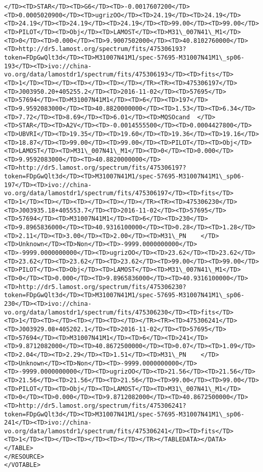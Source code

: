 \documentclass[11pt]{article}
\begin{document}
\begin{Verbatim}[commandchars=\\\{\}]
</TD><TD>STAR</TD><TD>G6</TD><TD>-0.0017607200</TD><TD>0.0005020900</TD><TD>ugrizOO</TD><TD>24.19</TD><TD>24.19</TD><TD>24.19</TD><TD>24.19</TD><TD>24.19</TD><TD>99.00</TD><TD>99.00</TD><TD>PILOT</TD><TD>Obj</TD><TD>LAMOST</TD><TD>M31\_007N41\_M1</TD><TD>0</TD><TD>0.000</TD><TD>9.9007502000</TD><TD>40.8102760000</TD><TD>http://dr5.lamost.org/spectrum/fits/475306193?token=FDpGwQlt3d</TD><TD>M31007N41M1/spec-57695-M31007N41M1\_sp06-193</TD><TD>ivo://china-vo.org/data/lamostdr1/spectrum/fits/475306193</TD><TD>fits</TD><TD>1</TD><TD></TD><TD></TD><TD></TD></TR><TR><TD>475306197</TD><TD>J003950.20+405255.2</TD><TD>2016-11-02</TD><TD>57695</TD><TD>57694</TD><TD>M31007N41M1</TD><TD>6</TD><TD>197</TD><TD>9.9592083000</TD><TD>40.8820000000</TD><TD>1.53</TD><TD>6.34</TD><TD>7.72</TD><TD>8.69</TD><TD>6.01</TD><TD>MQSOcand  </TD><TD>STAR</TD><TD>A2V</TD><TD>-0.0014555500</TD><TD>0.0004427800</TD><TD>UBVRI</TD><TD>19.35</TD><TD>19.60</TD><TD>19.36</TD><TD>19.16</TD><TD>18.87</TD><TD>99.00</TD><TD>99.00</TD><TD>PILOT</TD><TD>Obj</TD><TD>LAMOST</TD><TD>M31\_007N41\_M1</TD><TD>0</TD><TD>0.000</TD><TD>9.9592083000</TD><TD>40.8820000000</TD><TD>http://dr5.lamost.org/spectrum/fits/475306197?token=FDpGwQlt3d</TD><TD>M31007N41M1/spec-57695-M31007N41M1\_sp06-197</TD><TD>ivo://china-vo.org/data/lamostdr1/spectrum/fits/475306197</TD><TD>fits</TD><TD>1</TD><TD></TD><TD></TD><TD></TD></TR><TR><TD>475306230</TD><TD>J003935.18+405553.7</TD><TD>2016-11-02</TD><TD>57695</TD><TD>57694</TD><TD>M31007N41M1</TD><TD>6</TD><TD>230</TD><TD>9.8965836000</TD><TD>40.9316100000</TD><TD>0.28</TD><TD>1.28</TD><TD>2.11</TD><TD>3.00</TD><TD>2.00</TD><TD>M31\_PN    </TD><TD>Unknown</TD><TD>Non</TD><TD>-9999.0000000000</TD><TD>-9999.0000000000</TD><TD>ugrizOO</TD><TD>23.62</TD><TD>23.62</TD><TD>23.62</TD><TD>23.62</TD><TD>23.62</TD><TD>99.00</TD><TD>99.00</TD><TD>PILOT</TD><TD>Obj</TD><TD>LAMOST</TD><TD>M31\_007N41\_M1</TD><TD>0</TD><TD>0.000</TD><TD>9.8965836000</TD><TD>40.9316100000</TD><TD>http://dr5.lamost.org/spectrum/fits/475306230?token=FDpGwQlt3d</TD><TD>M31007N41M1/spec-57695-M31007N41M1\_sp06-230</TD><TD>ivo://china-vo.org/data/lamostdr1/spectrum/fits/475306230</TD><TD>fits</TD><TD>1</TD><TD></TD><TD></TD><TD></TD></TR><TR><TD>475306241</TD><TD>J003929.08+405202.1</TD><TD>2016-11-02</TD><TD>57695</TD><TD>57694</TD><TD>M31007N41M1</TD><TD>6</TD><TD>241</TD><TD>9.8712082000</TD><TD>40.8672500000</TD><TD>0.07</TD><TD>1.09</TD><TD>2.04</TD><TD>2.29</TD><TD>1.51</TD><TD>M31\_PN    </TD><TD>Unknown</TD><TD>Non</TD><TD>-9999.0000000000</TD><TD>-9999.0000000000</TD><TD>ugrizOO</TD><TD>21.56</TD><TD>21.56</TD><TD>21.56</TD><TD>21.56</TD><TD>21.56</TD><TD>99.00</TD><TD>99.00</TD><TD>PILOT</TD><TD>Obj</TD><TD>LAMOST</TD><TD>M31\_007N41\_M1</TD><TD>0</TD><TD>0.000</TD><TD>9.8712082000</TD><TD>40.8672500000</TD><TD>http://dr5.lamost.org/spectrum/fits/475306241?token=FDpGwQlt3d</TD><TD>M31007N41M1/spec-57695-M31007N41M1\_sp06-241</TD><TD>ivo://china-vo.org/data/lamostdr1/spectrum/fits/475306241</TD><TD>fits</TD><TD>1</TD><TD></TD><TD></TD><TD></TD></TR></TABLEDATA></DATA>
</TABLE>
</RESOURCE>
</VOTABLE>


    \end{Verbatim}
\end{document}
